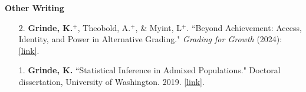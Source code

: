 \documentclass[margin]{res}
\begin{document}
\begin{resume}
\textbf{Other Writing}
\begin{itemize}
\item[2.] \textbf{Grinde, K.}$^{+}$, Theobold,  A.$^{+}$, \& Myint,  L$^{+}$. ``Beyond Achievement: Access, Identity, and Power in Alternative Grading." \textit{Grading for Growth} (2024): \href{https://gradingforgrowth.com/p/beyond-achievement?r=2ny4pq&utm_campaign=post&utm_medium=web}{[link]}.
\item[1.] \textbf{Grinde, K. }``Statistical Inference in Admixed Populations." Doctoral dissertation, University of Washington.  2019. \href{https://digital.lib.washington.edu/researchworks/handle/1773/44730?show=full}{[link]}.\\
\end{itemize}



\end{resume}
\end{document}
